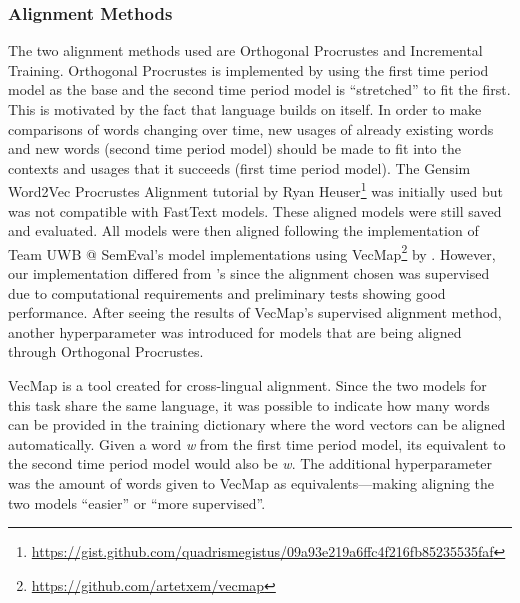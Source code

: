 \subsubsection{Alignment Methods}

The two alignment methods used are Orthogonal Procrustes and Incremental Training. Orthogonal Procrustes is implemented by using the first time period model as the base and the second time period model is “stretched” to fit the first. This is motivated by the fact that language builds on itself. In order to make comparisons of words changing over time, new usages of already existing words and new words (second time period model) should be made to fit into the contexts and usages that it succeeds (first time period model). The Gensim Word2Vec Procrustes Alignment tutorial by Ryan Heuser\footnote{\url{https://gist.github.com/quadrismegistus/09a93e219a6ffc4f216fb85235535faf}}  was initially used but was not compatible with FastText models. These aligned models were still saved and evaluated. All models were then aligned following the implementation of Team UWB @ SemEval’s \citep{prazak-etal-2020-uwb} model implementations using VecMap\footnote{\url{https://github.com/artetxem/vecmap}} by \citet{artetxe2018generalizing}. However, our implementation differed from \citet{prazak-etal-2020-uwb}’s since the alignment chosen was supervised due to computational requirements and preliminary tests showing good performance. After seeing the results of VecMap’s supervised alignment method, another hyperparameter was introduced for models that are being aligned through Orthogonal Procrustes.

VecMap is a tool created for cross-lingual alignment. Since the two models for this task share the same language, it was possible to indicate how many words can be provided in the training dictionary where the word vectors can be aligned automatically. Given a word \emph{w} from the first time period model, its equivalent to the second time period model would also be \emph{w}. The additional hyperparameter was the amount of words given to VecMap as equivalents—making aligning the two models “easier” or “more supervised”.



